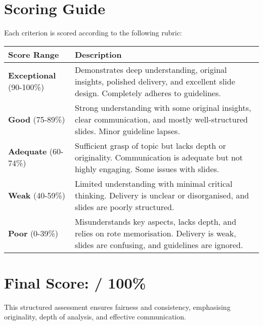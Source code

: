 \documentclass[a4paper,10pt]{article}
\begin{document}
\section*{Scoring Guide}
Each criterion is scored according to the following rubric:

{\small
\begin{longtable}{R{3.5cm} R{11cm}}
    \toprule
    \textbf{Score Range} & \textbf{Description} \\
    \midrule
    \textbf{Exceptional} (90-100\%) & Demonstrates deep understanding, original insights, polished delivery, and excellent slide design. Completely adheres to guidelines. \\
    \textbf{Good} (75-89\%) & Strong understanding with some original insights, clear communication, and mostly well-structured slides. Minor guideline lapses. \\
    \textbf{Adequate} (60-74\%) & Sufficient grasp of topic but lacks depth or originality. Communication is adequate but not highly engaging. Some issues with slides. \\
    \textbf{Weak} (40-59\%) & Limited understanding with minimal critical thinking. Delivery is unclear or disorganised, and slides are poorly structured. \\
    \textbf{Poor} (0-39\%) & Misunderstands key aspects, lacks depth, and relies on rote memorisation. Delivery is weak, slides are confusing, and guidelines are ignored. \\
    \bottomrule
\end{longtable}}

\section*{Final Score: \underline{\hspace{2cm}} / 100\%}

This structured assessment ensures fairness and consistency, emphasising originality, depth of analysis, and effective communication.
\end{document}
